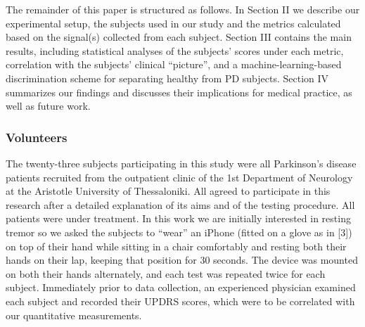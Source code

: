 The remainder of this paper is structured as follows. In Section II we describe our experimental setup, the subjects used in our study and the metrics calculated based on the signal(s) collected from each subject. Section III contains the main results, including statistical analyses of the subjects’ scores under each metric, correlation with the subjects’ clinical “picture”, and a machine-learning-based discrimination scheme for separating healthy from PD subjects. Section IV summarizes our findings and discusses their implications for medical practice, as well as future work.

\subsubsection{Volunteers}
\label{subsubsec:smartCT2Volunteers}
The twenty-three subjects participating in this study were all Parkinson's disease patients recruited from the outpatient clinic of the 1st Department of Neurology at the Aristotle University of Thessaloniki. All agreed to participate in this research after a detailed explanation of its aims and of the testing procedure. All patients were under treatment. In this work we are initially interested in resting tremor so we asked the subjects to ``wear'' an iPhone (fitted on a glove as in [3]) on top of their hand while sitting in a chair comfortably and resting both their hands on their lap, keeping that position for 30 seconds. The device was mounted on both their hands alternately, and each test was repeated twice for each subject. Immediately prior to data collection, an experienced physician examined each subject and recorded their UPDRS scores, which were to be correlated with our quantitative measurements. 

